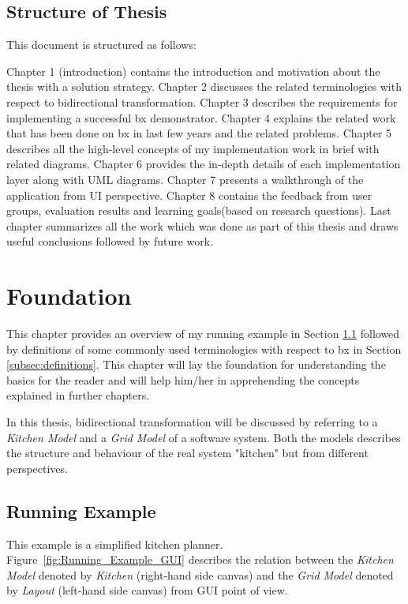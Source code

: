 \subsection{Structure of Thesis}\label{subsec:structure}
This document is structured as follows: 

Chapter 1 (introduction) contains the introduction and motivation about the thesis with a solution strategy. Chapter 2 discusses the related terminologies with respect to bidirectional transformation. Chapter 3 describes the requirements for implementing a successful bx demonstrator. Chapter 4 explains the related work that has been done on bx in last few years and the related problems. Chapter 5 describes all the high-level concepts of my implementation work in brief with related diagrams. Chapter 6 provides the in-depth details of each implementation layer along with UML diagrams. Chapter 7 presents a walkthrough of the application from UI perspective. Chapter 8 contains the feedback from user groups, evaluation results and learning goals(based on research questions). Last chapter summarizes all the work which was done as part of this thesis and draws useful conclusions followed by future work.

\section{Foundation}\label{sec:foundation}
This chapter provides an overview of my running example in Section \ref{subsec:runningexample} followed by definitions of some commonly used terminologies with respect to bx in Section \ref{subsec:definitions}. This chapter will lay the foundation for understanding the basics for the reader and will help him/her in apprehending the concepts explained in further chapters.

In this thesis, bidirectional transformation will be discussed by referring to a \textit{Kitchen Model} and a \textit{Grid Model} of a software system. Both the models describes the structure and behaviour of the real system "kitchen" but from different perspectives.

\subsection{Running Example}\label{subsec:runningexample}
This example is a simplified kitchen planner. Figure~\ref{fig:Running_Example_GUI} describes the relation between the \textit{Kitchen Model} denoted by \textit{Kitchen} (right-hand side canvas) and the \textit{Grid Model} denoted by \textit{Layout} (left-hand side canvas) from GUI point of view. 

